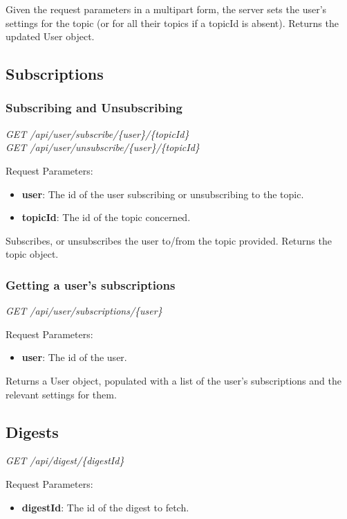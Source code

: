 \documentclass[12pt]{article}
\begin{document}
\begin{appendices}
Given the request parameters in a multipart form, the server sets the user's settings for the topic (or for all their topics if a topicId is absent). Returns the updated User object.

\subsection{Subscriptions}

\subsubsection{Subscribing and Unsubscribing}

\emph{GET	/api/user/subscribe/\{user\}/\{topicId\}}\\
\emph{GET	/api/user/unsubscribe/\{user\}/\{topicId\}}

Request Parameters:
\begin{itemize}
	\item \textbf{user}: The id of the user subscribing or unsubscribing to the topic.
	\item \textbf{topicId}: The id of the topic concerned.
\end{itemize}

Subscribes, or unsubscribes the user to/from the topic provided. Returns the topic object.

\subsubsection{Getting a user's subscriptions}

\emph{GET	/api/user/subscriptions/\{user\}}

Request Parameters:
\begin{itemize}
	\item \textbf{user}: The id of the user.
\end{itemize}

Returns a User object, populated with a list of the user's subscriptions and the relevant settings for them.

\subsection{Digests}

\emph{GET	/api/digest/\{digestId\}}

Request Parameters:
\begin{itemize}
	\item \textbf{digestId}: The id of the digest to fetch.
\end{itemize}


\end{appendices}
\end{document}

